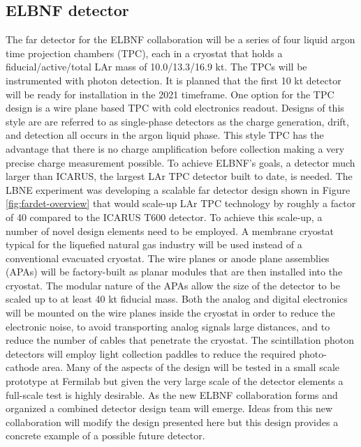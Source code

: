 
\subsection{ELBNF detector}

The far detector for the ELBNF collaboration will be a series of four liquid argon time projection chambers (TPC), each in a cryostat that holds a fiducial/active/total LAr mass of 10.0/13.3/16.9 kt. The TPCs will be instrumented with photon detection. It is planned that the first 10 kt detector will be ready for installation in the 2021 timeframe. One option for the TPC design is a wire plane based TPC with cold electronics readout. Designs of this style are are referred to as single-phase detectors as the charge generation, drift, and detection all occurs in the argon liquid phase. This style TPC has the advantage that there is no charge amplification before collection making a very precise charge measurement possible. To achieve ELBNF's goals, a detector much larger than ICARUS, the largest LAr TPC detector built to date, is needed. The LBNE experiment was developing a scalable far detector design shown in Figure \ref{fig:fardet-overview} that would scale-up LAr TPC technology by roughly a factor of 40 compared to the ICARUS T600 detector. To achieve this scale-up, a number of novel design elements need to be employed. A membrane cryostat typical for the liquefied natural gas industry will be used instead of a conventional evacuated cryostat. The wire planes or anode plane assemblies (APAs) will be factory-built as planar modules that are then installed into the cryostat. The modular nature of the APAs allow the size of the detector to be scaled up to at least 40 kt fiducial mass. Both the analog and digital electronics will be mounted on the wire planes inside the cryostat in order to reduce the electronic noise, to avoid transporting analog signals large distances, and to reduce the number of cables that penetrate the cryostat. The scintillation photon detectors will employ light collection paddles to reduce the required photo-cathode area. Many of the aspects of the design will be tested in a small scale prototype at Fermilab but given the very large scale of the detector elements a full-scale test is highly desirable. As the new ELBNF collaboration forms and organized a combined detector design team will emerge. Ideas from this new collaboration will modify the design presented here but this design provides a concrete example of a possible future detector. 



